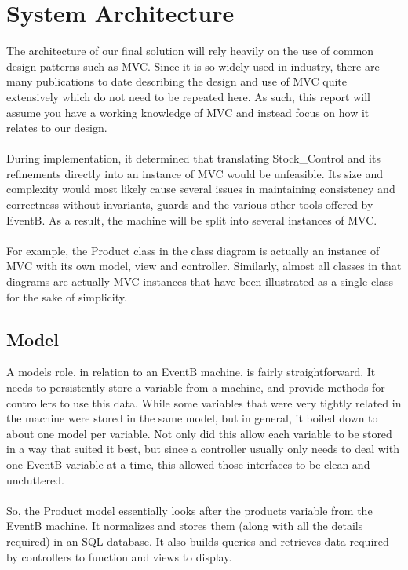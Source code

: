 \documentclass[a4paper]{article}
\begin{document}
\section{System Architecture}
The architecture of our final solution will rely heavily on the use of common design patterns such as MVC. Since it is so widely used in industry, there are many publications to date describing the design and use of MVC quite extensively which do not need to be repeated here. As such, this report will assume you have a working knowledge of MVC and instead focus on how it relates to our design.
\\\\
During implementation, it determined that translating Stock\_Control and its refinements directly into an instance of MVC would be unfeasible. Its size and complexity would most likely cause several issues in maintaining consistency and correctness without invariants, guards and the various other tools offered by EventB. 
As a result, the machine will be split into several instances of MVC.
\\\\
For example, the Product class in the class diagram is actually an instance of MVC with its own model, view and controller. Similarly, almost all classes in that diagrams are actually MVC instances that have been illustrated as a single class for the sake of simplicity.

\subsection{Model}
A models role, in relation to an EventB machine, is fairly straightforward. It needs to persistently store a variable from a machine, and provide methods for controllers to use this data. 
While some variables that were very tightly related in the machine were stored in the same model, but in general, it boiled down to about one model per variable. Not only did this allow each variable to be stored in a way that suited it best, but since a controller usually only needs to deal with one EventB variable at a time, this allowed those interfaces to be clean and uncluttered. 
\\\\
So, the Product model essentially looks after the products variable from the EventB machine. It normalizes and stores them (along with all the details required) in an SQL database. It also builds queries and retrieves data required by controllers to function and views to display.
\end{document}

